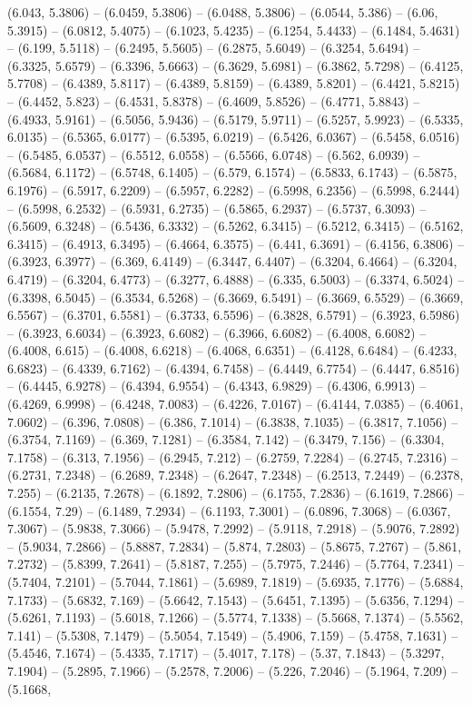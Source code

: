 (6.043, 5.3806) -- (6.0459, 5.3806) -- (6.0488, 5.3806) -- (6.0544, 5.386) -- (6.06, 5.3915) -- (6.0812, 5.4075) -- (6.1023, 5.4235) -- (6.1254, 5.4433) -- (6.1484, 5.4631) -- (6.199, 5.5118) -- (6.2495, 5.5605) -- (6.2875, 5.6049) -- (6.3254, 5.6494) -- (6.3325, 5.6579) -- (6.3396, 5.6663) -- (6.3629, 5.6981) -- (6.3862, 5.7298) -- (6.4125, 5.7708) -- (6.4389, 5.8117) -- (6.4389, 5.8159) -- (6.4389, 5.8201) -- (6.4421, 5.8215) -- (6.4452, 5.823) -- (6.4531, 5.8378) -- (6.4609, 5.8526) -- (6.4771, 5.8843) -- (6.4933, 5.9161) -- (6.5056, 5.9436) -- (6.5179, 5.9711) -- (6.5257, 5.9923) -- (6.5335, 6.0135) -- (6.5365, 6.0177) -- (6.5395, 6.0219) -- (6.5426, 6.0367) -- (6.5458, 6.0516) -- (6.5485, 6.0537) -- (6.5512, 6.0558) -- (6.5566, 6.0748) -- (6.562, 6.0939) -- (6.5684, 6.1172) -- (6.5748, 6.1405) -- (6.579, 6.1574) -- (6.5833, 6.1743) -- (6.5875, 6.1976) -- (6.5917, 6.2209) -- (6.5957, 6.2282) -- (6.5998, 6.2356) -- (6.5998, 6.2444) -- (6.5998, 6.2532) -- (6.5931, 6.2735) -- (6.5865, 6.2937) -- (6.5737, 6.3093) -- (6.5609, 6.3248) -- (6.5436, 6.3332) -- (6.5262, 6.3415) -- (6.5212, 6.3415) -- (6.5162, 6.3415) -- (6.4913, 6.3495) -- (6.4664, 6.3575) -- (6.441, 6.3691) -- (6.4156, 6.3806) -- (6.3923, 6.3977) -- (6.369, 6.4149) -- (6.3447, 6.4407) -- (6.3204, 6.4664) -- (6.3204, 6.4719) -- (6.3204, 6.4773) -- (6.3277, 6.4888) -- (6.335, 6.5003) -- (6.3374, 6.5024) -- (6.3398, 6.5045) -- (6.3534, 6.5268) -- (6.3669, 6.5491) -- (6.3669, 6.5529) -- (6.3669, 6.5567) -- (6.3701, 6.5581) -- (6.3733, 6.5596) -- (6.3828, 6.5791) -- (6.3923, 6.5986) -- (6.3923, 6.6034) -- (6.3923, 6.6082) -- (6.3966, 6.6082) -- (6.4008, 6.6082) -- (6.4008, 6.615) -- (6.4008, 6.6218) -- (6.4068, 6.6351) -- (6.4128, 6.6484) -- (6.4233, 6.6823) -- (6.4339, 6.7162) -- (6.4394, 6.7458) -- (6.4449, 6.7754) -- (6.4447, 6.8516) -- (6.4445, 6.9278) -- (6.4394, 6.9554) -- (6.4343, 6.9829) -- (6.4306, 6.9913) -- (6.4269, 6.9998) -- (6.4248, 7.0083) -- (6.4226, 7.0167) -- (6.4144, 7.0385) -- (6.4061, 7.0602) -- (6.396, 7.0808) -- (6.386, 7.1014) -- (6.3838, 7.1035) -- (6.3817, 7.1056) -- (6.3754, 7.1169) -- (6.369, 7.1281) -- (6.3584, 7.142) -- (6.3479, 7.156) -- (6.3304, 7.1758) -- (6.313, 7.1956) -- (6.2945, 7.212) -- (6.2759, 7.2284) -- (6.2745, 7.2316) -- (6.2731, 7.2348) -- (6.2689, 7.2348) -- (6.2647, 7.2348) -- (6.2513, 7.2449) -- (6.2378, 7.255) -- (6.2135, 7.2678) -- (6.1892, 7.2806) -- (6.1755, 7.2836) -- (6.1619, 7.2866) -- (6.1554, 7.29) -- (6.1489, 7.2934) -- (6.1193, 7.3001) -- (6.0896, 7.3068) -- (6.0367, 7.3067) -- (5.9838, 7.3066) -- (5.9478, 7.2992) -- (5.9118, 7.2918) -- (5.9076, 7.2892) -- (5.9034, 7.2866) -- (5.8887, 7.2834) -- (5.874, 7.2803) -- (5.8675, 7.2767) -- (5.861, 7.2732) -- (5.8399, 7.2641) -- (5.8187, 7.255) -- (5.7975, 7.2446) -- (5.7764, 7.2341) -- (5.7404, 7.2101) -- (5.7044, 7.1861) -- (5.6989, 7.1819) -- (5.6935, 7.1776) -- (5.6884, 7.1733) -- (5.6832, 7.169) -- (5.6642, 7.1543) -- (5.6451, 7.1395) -- (5.6356, 7.1294) -- (5.6261, 7.1193) -- (5.6018, 7.1266) -- (5.5774, 7.1338) -- (5.5668, 7.1374) -- (5.5562, 7.141) -- (5.5308, 7.1479) -- (5.5054, 7.1549) -- (5.4906, 7.159) -- (5.4758, 7.1631) -- (5.4546, 7.1674) -- (5.4335, 7.1717) -- (5.4017, 7.178) -- (5.37, 7.1843) -- (5.3297, 7.1904) -- (5.2895, 7.1966) -- (5.2578, 7.2006) -- (5.226, 7.2046) -- (5.1964, 7.209) -- (5.1668, 